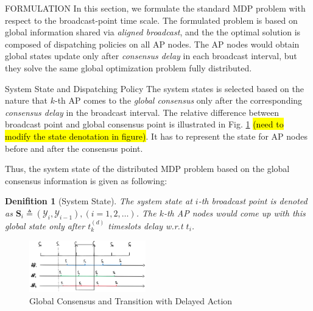 \documentclass[10pt, conference, letterpaper]{IEEEtran}
\newtheorem{definition}{Denifition}
\newcommand{\define}{\triangleq}
\newcommand{\Stat}{\mathbf{S}}
\newcommand{\Obsv}{\mathcal{Y}}
\begin{document}
    \begin{section}{FORMULATION}
        \label{sec:formulation}
        In this section, we formulate the standard MDP problem with respect to the broadcast-point time scale. The formulated problem is based on global information shared via \emph{aligned broadcast}, and the the optimal solution is composed of dispatching policies on all AP nodes. The AP nodes would obtain global states update only after \emph{consensus delay} in each broadcast interval, but they solve the same global optimization problem fully distributed.

        \begin{subsection}{System State and Dispatching Policy}
            The system states is selected based on the nature that $k$-th AP comes to the \emph{global consensus} only after the corresponding \emph{consensus delay} in the broadcast interval.
            The relative difference between broadcast point and global consensus point is illustrated in Fig. \ref{fig:br-trans} \hl{(need to modify the state denotation in figure)}. It has to represent the state for AP nodes before and after the consensus point.

            Thus, the system state of the distributed MDP problem based on the global consensus information is given as following:
            \begin{definition}[System State]
                The system state at $i$-th broadcast point is denoted as $\Stat_i \define (\Obsv_{i}, \Obsv_{i-1}), (i=1,2,\dots)$.
                The $k$-th AP nodes would come up with this global state only after $t^{(d)}_k$ timeslots delay w.r.t $t_i$.
            \end{definition}
            \begin{figure}[ht]
                \centering
                \includegraphics[width=0.45\textwidth]{broadcast-trans.png}
                \caption{Global Consensus and Transition with Delayed Action}
                \label{fig:br-trans}
            \end{figure}


\end{subsection}
\end{section}
\end{document}
